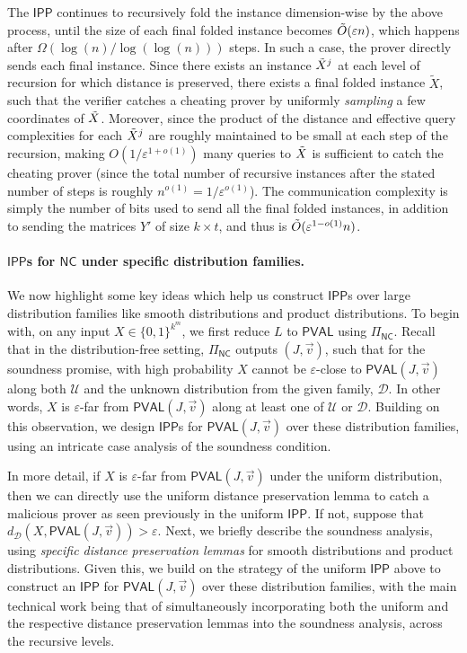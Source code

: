 \documentclass[11pt]{article}
\newcommand{\NC}{\mathsf{NC}}
\newcommand{\PVAL}{\mathsf{PVAL}}
\newcommand{\IPP}{\mathsf{IPP}}
\newcommand{\sU}{\mathcal{U}}
\newcommand{\sD}{\mathcal{D}}
\begin{document}
The $\IPP$ continues to recursively fold the instance dimension-wise by the above process, until the size of each final folded instance becomes $\Tilde{O}(\varepsilon n)$, which happens after $\Omega(\log(n)/\log(\log(n)))$ steps. In such a case, the prover directly sends each final instance. Since there exists an instance $\Tilde{X}^j$ at each level of recursion for which distance is preserved, there exists a final folded instance $\tilde{X}$, such that the verifier catches a cheating prover by uniformly \textit{sampling} a few coordinates of $\Tilde{X}$. Moreover, since the product of the distance and effective query complexities for each $\Tilde{X}^j$ are roughly maintained to be small at each step of the recursion, making $O(1/\varepsilon^{1+o(1)})$ many queries to $\Tilde{X}$ is sufficient to catch the cheating prover (since the total number of recursive instances after the stated number of steps is roughly $n^{o(1)} = 1/\varepsilon^{o(1)}$). The communication complexity is simply the number of bits used to send all the final folded instances, in addition to sending the matrices $Y'$ of size $k \times t$, and thus is $\Tilde{O}(\varepsilon^{1-o(1)} n)$.

\paragraph*{$\IPP$s for $\NC$ under specific distribution families.}
 We now highlight some key ideas which help us construct $\IPP$s over large distribution families like smooth distributions and product distributions. To begin with, on any input $X \in \{0,1\}^{k^m}$, we first reduce $L$ to $\PVAL$ using $\Pi_\NC$. Recall that in the distribution-free setting, $\Pi_\NC$ outputs $(J,\vec{v})$, such that for the soundness promise, with high probability $X$ cannot be $\varepsilon$-close to $\PVAL(J,\Vec{v})$ along both $\sU$ and the unknown distribution from the given family, $\sD$. In other words, $X$ is $\varepsilon$-far from $\PVAL(J,\Vec{v})$ along at least one of $\sU$ or $\sD$. Building on this observation, we design $\IPP$s for $\PVAL(J,\Vec{v})$ over these distribution families, using an intricate case analysis of the soundness condition. 

In more detail, if $X$ is $\varepsilon$-far from $\PVAL(J,\vec{v})$ under the uniform distribution, then we can directly use the uniform distance preservation lemma to catch a malicious prover as seen previously in the uniform $\IPP$. If not, suppose that $d_\sD(X,\PVAL(J,\vec{v})) > \varepsilon$. Next, we briefly describe the soundness analysis, using \textit{specific distance preservation lemmas} for smooth distributions and product distributions. Given this, we build on the strategy of the uniform $\IPP$ above to construct an $\IPP$ for $\PVAL(J,\Vec{v})$ over these distribution families, with the main technical work being that of simultaneously incorporating both the uniform and the respective distance preservation lemmas into the soundness analysis, across the recursive levels.
\end{document}
